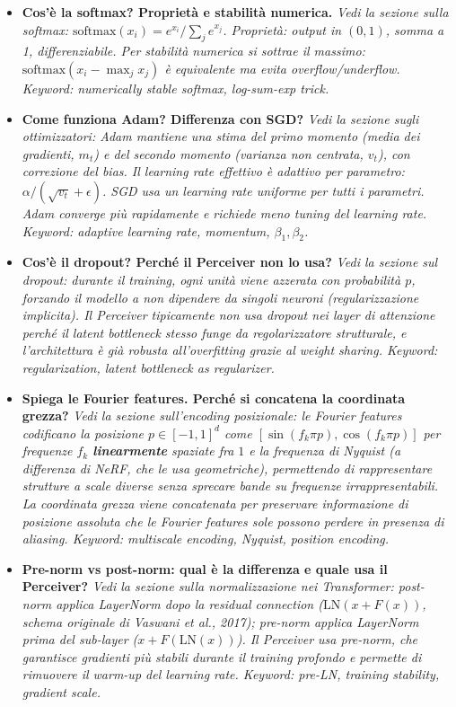\documentclass[
  11pt,
]{article}
\begin{document}
\begin{itemize}
  \item \textbf{Cos'è la softmax? Proprietà e stabilità numerica.}
  \textit{Vedi la sezione sulla softmax: $\text{softmax}(x_i) = e^{x_i}/\sum_j e^{x_j}$. Proprietà: output in $(0,1)$, somma a 1, differenziabile. Per stabilità numerica si sottrae il massimo: $\text{softmax}(x_i - \max_j x_j)$ è equivalente ma evita overflow/underflow. Keyword: numerically stable softmax, log-sum-exp trick.}

  \item \textbf{Come funziona Adam? Differenza con SGD?}
  \textit{Vedi la sezione sugli ottimizzatori: Adam mantiene una stima del primo momento (media dei gradienti, $m_t$) e del secondo momento (varianza non centrata, $v_t$), con correzione del bias. Il learning rate effettivo è adattivo per parametro: $\alpha / (\sqrt{v_t} + \epsilon)$. SGD usa un learning rate uniforme per tutti i parametri. Adam converge più rapidamente e richiede meno tuning del learning rate. Keyword: adaptive learning rate, momentum, $\beta_1, \beta_2$.}

  \item \textbf{Cos'è il dropout? Perché il Perceiver non lo usa?}
  \textit{Vedi la sezione sul dropout: durante il training, ogni unità viene azzerata con probabilità $p$, forzando il modello a non dipendere da singoli neuroni (regularizzazione implicita). Il Perceiver tipicamente non usa dropout nei layer di attenzione perché il latent bottleneck stesso funge da regolarizzatore strutturale, e l'architettura è già robusta all'overfitting grazie al weight sharing. Keyword: regularization, latent bottleneck as regularizer.}

  \item \textbf{Spiega le Fourier features. Perché si concatena la coordinata grezza?}
  \textit{Vedi la sezione sull'encoding posizionale: le Fourier features codificano la posizione $p \in [-1,1]^d$ come $[\sin(f_k \pi p), \cos(f_k \pi p)]$ per frequenze $f_k$ \textbf{linearmente} spaziate fra $1$ e la frequenza di Nyquist (a differenza di NeRF, che le usa geometriche), permettendo di rappresentare strutture a scale diverse senza sprecare bande su frequenze irrappresentabili. La coordinata grezza viene concatenata per preservare informazione di posizione assoluta che le Fourier features sole possono perdere in presenza di aliasing. Keyword: multiscale encoding, Nyquist, position encoding.}

  \item \textbf{Pre-norm vs post-norm: qual è la differenza e quale usa il Perceiver?}
  \textit{Vedi la sezione sulla normalizzazione nei Transformer: post-norm applica LayerNorm \emph{dopo} la residual connection ($\text{LN}(x + F(x))$, schema originale di Vaswani et al., 2017); pre-norm applica LayerNorm \emph{prima} del sub-layer ($x + F(\text{LN}(x))$). Il Perceiver usa pre-norm, che garantisce gradienti più stabili durante il training profondo e permette di rimuovere il warm-up del learning rate. Keyword: pre-LN, training stability, gradient scale.}

\end{itemize}
\end{document}
